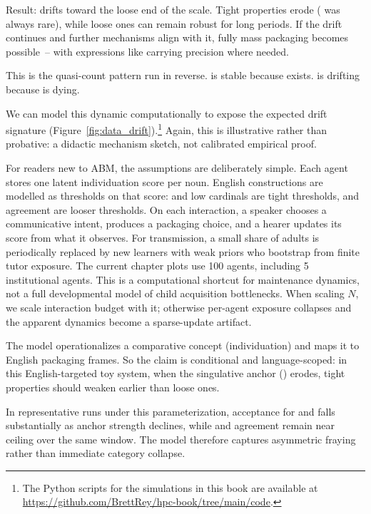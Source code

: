 Result:  drifts toward the loose end of the scale. Tight properties erode ( was always rare), while loose ones can remain robust for long periods. If the drift continues and further mechanisms align with it, fully mass packaging becomes possible~-- with expressions like  carrying precision where needed.

This is the quasi-count pattern run in reverse.  is stable because  exists.  is drifting because  is dying.

We can model this dynamic computationally to expose the expected drift signature (Figure~\ref{fig:data_drift}).\footnote{The Python scripts for the simulations in this book are available at \url{https://github.com/BrettRey/hpc-book/tree/main/code}.} Again, this is illustrative rather than probative: a didactic mechanism sketch, not calibrated empirical proof.

For readers new to ABM, the assumptions are deliberately simple. Each agent stores one latent individuation score per noun. English constructions are modelled as thresholds on that score:  and low cardinals are tight thresholds,  and agreement are looser thresholds. On each interaction, a speaker chooses a communicative intent, produces a packaging choice, and a hearer updates its score from what it observes. For transmission, a small share of adults is periodically replaced by new learners with weak priors who bootstrap from finite tutor exposure. The current chapter plots use 100 agents, including 5 institutional agents. This is a computational shortcut for maintenance dynamics, not a full developmental model of child acquisition bottlenecks. When scaling $N$, we scale interaction budget with it; otherwise per-agent exposure collapses and the apparent dynamics become a sparse-update artifact.

The model operationalizes a comparative concept (individuation) and maps it to English packaging frames. So the claim is conditional and language-scoped: in this English-targeted toy system, when the singulative anchor () erodes, tight properties should weaken earlier than loose ones.

In representative runs under this parameterization, acceptance for  and  falls substantially as anchor strength declines, while  and agreement remain near ceiling over the same window. The model therefore captures asymmetric fraying rather than immediate category collapse.


